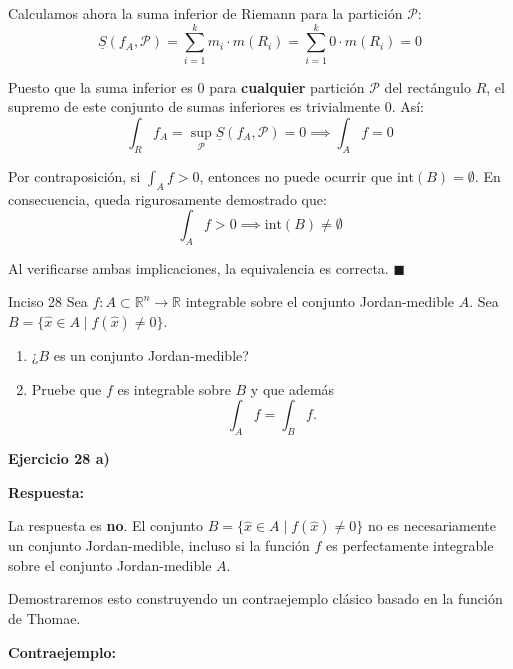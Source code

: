\documentclass[11pt,letterpaper]{article}
\begin{document}
Calculamos ahora la suma inferior de Riemann para la partición $\mathcal{P}$:
\begin{equation*}
\underline{S}(f_A, \mathcal{P}) = \sum_{i=1}^{k} m_i \cdot m(R_i) = \sum_{i=1}^{k} 0 \cdot m(R_i) = 0
\end{equation*}

Puesto que la suma inferior es $0$ para \textbf{cualquier} partición $\mathcal{P}$ del rectángulo $R$, el supremo de este conjunto de sumas inferiores es trivialmente $0$. Así:
\begin{equation*}
\int_R f_A = \sup_{\mathcal{P}} \underline{S}(f_A, \mathcal{P}) = 0 \implies \int_A f = 0
\end{equation*}

Por contraposición, si $\int_A f > 0$, entonces no puede ocurrir que $\text{int}(B) = \emptyset$. En consecuencia, queda rigurosamente demostrado que:
\begin{equation*}
\int_A f > 0 \implies \text{int}(B) \neq \emptyset
\end{equation*}

Al verificarse ambas implicaciones, la equivalencia es correcta. \hfill $\blacksquare$

\begin{inciso}{Inciso 28}
Sea $f:A\subset\mathbb{R}^{n}\rightarrow\mathbb{R}$ integrable sobre el conjunto Jordan-medible $A$. Sea $B=\{\hat{x}\in A\mid f(\hat{x})\neq 0\}.$
\begin{enumerate}[label=\alph*)]
    \item ¿$B$ es un conjunto Jordan-medible?
    \item Pruebe que $f$ es integrable sobre $B$ y que además
    \begin{equation*}
        \int_{A}f=\int_{B}f.
    \end{equation*}
\end{enumerate}
\end{inciso}

\textbf{Ejercicio 28 a)}

\textbf{Respuesta:} 

La respuesta es \textbf{no}. El conjunto $B = \{\hat{x} \in A \mid f(\hat{x}) \neq 0\}$ no es necesariamente un conjunto Jordan-medible, incluso si la función $f$ es perfectamente integrable sobre el conjunto Jordan-medible $A$. 

Demostraremos esto construyendo un contraejemplo clásico basado en la función de Thomae.

\textbf{Contraejemplo:}
\end{document}
